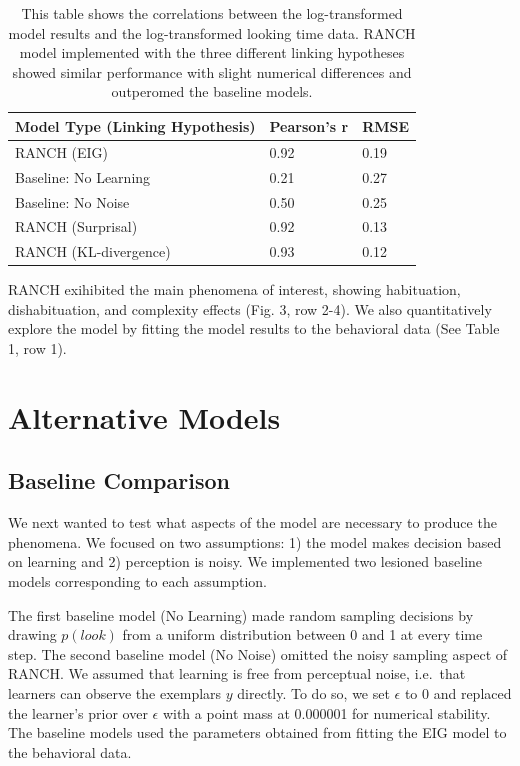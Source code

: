 \documentclass[10pt, letterpaper]{article}
\begin{document}
\begin{table}[ht]
\centering
\begin{tabular}{lll}
  \hline
Model Type (Linking Hypothesis) & Pearson's r & RMSE \\ 
  \hline
RANCH (EIG) & 0.92 & 0.19 \\ 
  Baseline: No Learning & 0.21 & 0.27 \\ 
  Baseline: No Noise & 0.50 & 0.25 \\ 
  RANCH (Surprisal) & 0.92 & 0.13 \\ 
  RANCH (KL-divergence) & 0.93 & 0.12 \\ 
   \hline
\end{tabular}
\caption{This table shows the correlations between the log-transformed model results and the log-transformed looking time data. RANCH model implemented with the three different linking hypotheses showed similar performance with slight numerical differences and outperomed the baseline models.} 
\end{table}

RANCH exihibited the main phenomena of interest, showing habituation,
dishabituation, and complexity effects (Fig. 3, row 2-4). We also
quantitatively explore the model by fitting the model results to the
behavioral data (See Table 1, row 1).

\hypertarget{alternative-models}{%
\section{Alternative Models}\label{alternative-models}}

\hypertarget{baseline-comparison}{%
\subsection{Baseline Comparison}\label{baseline-comparison}}

We next wanted to test what aspects of the model are necessary to
produce the phenomena. We focused on two assumptions: 1) the model makes
decision based on learning and 2) perception is noisy. We implemented
two lesioned baseline models corresponding to each assumption.

The first baseline model (No Learning) made random sampling decisions by
drawing \(p(look)\) from a uniform distribution between 0 and 1 at every
time step. The second baseline model (No Noise) omitted the noisy
sampling aspect of RANCH. We assumed that learning is free from
perceptual noise, i.e.~that learners can observe the exemplars \(y\)
directly. To do so, we set \(\epsilon\) to 0 and replaced the learner's
prior over \(\epsilon\) with a point mass at 0.000001 for numerical
stability. The baseline models used the parameters obtained from fitting
the EIG model to the behavioral data.
\end{document}
